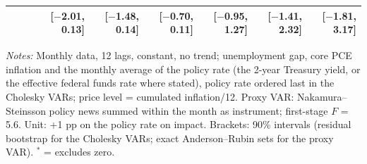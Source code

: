\begin{table}[tp]
{\begin{tabular}{llrrrrrrr}
 & & & {\scriptsize [$-$2.01, 0.13]} & {\scriptsize [$-$1.48, 0.14]} & {\scriptsize [$-$0.70, 0.11]} & {\scriptsize [$-$0.95, 1.27]} & {\scriptsize [$-$1.41, 2.32]} & {\scriptsize [$-$1.81, 3.17]}\\
\bottomrule\end{tabular}}
\begin{flushleft}\footnotesize\textit{Notes:} Monthly data, 12 lags, constant, no trend; unemployment gap, core PCE inflation and the monthly average of the policy rate (the 2-year Treasury yield, or the effective federal funds rate where stated), policy rate ordered last in the Cholesky VARs; price level = cumulated inflation/12. Proxy VAR: Nakamura--Steinsson policy news summed within the month as instrument; first-stage $F$ = 5.6. Unit: +1 pp on the policy rate on impact. Brackets: 90\% intervals (residual bootstrap for the Cholesky VARs; exact Anderson--Rubin sets for the proxy VAR). $^{*}$ = excludes zero.\end{flushleft}
\end{table}
